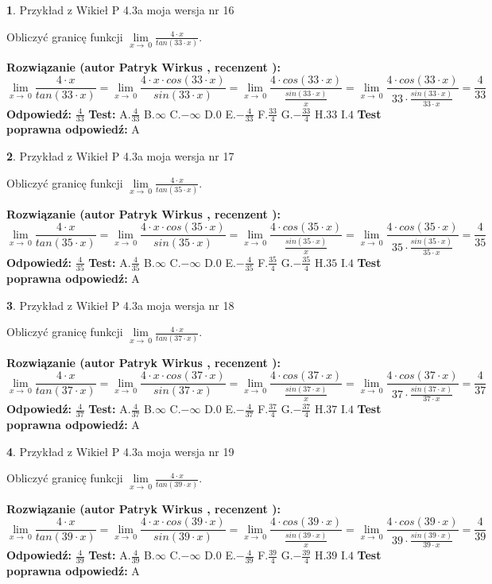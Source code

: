 \documentclass[12pt, a4paper]{article}
\theoremstyle{definition} %
\newtheorem{zad}{}
\newcommand{\zadStart}[1]{\begin{zad}#1\newline}
\newcommand{\zadStop}{\end{zad}}
\newcommand{\rozwStart}[2]{\noindent \textbf{Rozwiązanie (autor #1 , recenzent #2): }\newline}
\newcommand{\rozwStop}{\newline}
\newcommand{\odpStart}{\noindent \textbf{Odpowiedź:}\newline}
\newcommand{\odpStop}{\newline}
\newcommand{\testStart}{\noindent \textbf{Test:}\newline}
\newcommand{\testStop}{\newline}
\newcommand{\kluczStart}{\noindent \textbf{Test poprawna odpowiedź:}\newline}
\newcommand{\kluczStop}{\newline}
\begin{document}
\zadStart{Przykład z Wikieł P 4.3a moja wersja nr 16}


Obliczyć granicę funkcji $\lim\limits_{x\to\ 0}\frac{4 \cdot x}{tan(33 \cdot x)}$.
\zadStop
\rozwStart{Patryk Wirkus}{}
$$\lim\limits_{x\to\ 0}\frac{4 \cdot x}{tan(33 \cdot x)}=\lim\limits_{x\to\ 0}\frac{4 \cdot x \cdot cos(33 \cdot x)}{sin(33 \cdot x)}=\lim\limits_{x\to\ 0}\frac{4 \cdot cos(33 \cdot x)}{\frac{sin(33 \cdot x)}{x}}=\lim\limits_{x\to\ 0}\frac{4 \cdot cos(33 \cdot x)}{33 \cdot \frac{sin(33 \cdot x)}{33 \cdot x}} = \frac{4}{33}$$
\rozwStop
\odpStart
$\frac{4}{33}$
\odpStop
\testStart
A.$\frac{4}{33}$
B.$\infty$
C.$-\infty$
D.$0$
E.$-\frac{4}{33}$
F.$\frac{33}{4}$
G.$-\frac{33}{4}$
H.$33$
I.$4$
\testStop
\kluczStart
A
\kluczStop



\zadStart{Przykład z Wikieł P 4.3a moja wersja nr 17}


Obliczyć granicę funkcji $\lim\limits_{x\to\ 0}\frac{4 \cdot x}{tan(35 \cdot x)}$.
\zadStop
\rozwStart{Patryk Wirkus}{}
$$\lim\limits_{x\to\ 0}\frac{4 \cdot x}{tan(35 \cdot x)}=\lim\limits_{x\to\ 0}\frac{4 \cdot x \cdot cos(35 \cdot x)}{sin(35 \cdot x)}=\lim\limits_{x\to\ 0}\frac{4 \cdot cos(35 \cdot x)}{\frac{sin(35 \cdot x)}{x}}=\lim\limits_{x\to\ 0}\frac{4 \cdot cos(35 \cdot x)}{35 \cdot \frac{sin(35 \cdot x)}{35 \cdot x}} = \frac{4}{35}$$
\rozwStop
\odpStart
$\frac{4}{35}$
\odpStop
\testStart
A.$\frac{4}{35}$
B.$\infty$
C.$-\infty$
D.$0$
E.$-\frac{4}{35}$
F.$\frac{35}{4}$
G.$-\frac{35}{4}$
H.$35$
I.$4$
\testStop
\kluczStart
A
\kluczStop



\zadStart{Przykład z Wikieł P 4.3a moja wersja nr 18}


Obliczyć granicę funkcji $\lim\limits_{x\to\ 0}\frac{4 \cdot x}{tan(37 \cdot x)}$.
\zadStop
\rozwStart{Patryk Wirkus}{}
$$\lim\limits_{x\to\ 0}\frac{4 \cdot x}{tan(37 \cdot x)}=\lim\limits_{x\to\ 0}\frac{4 \cdot x \cdot cos(37 \cdot x)}{sin(37 \cdot x)}=\lim\limits_{x\to\ 0}\frac{4 \cdot cos(37 \cdot x)}{\frac{sin(37 \cdot x)}{x}}=\lim\limits_{x\to\ 0}\frac{4 \cdot cos(37 \cdot x)}{37 \cdot \frac{sin(37 \cdot x)}{37 \cdot x}} = \frac{4}{37}$$
\rozwStop
\odpStart
$\frac{4}{37}$
\odpStop
\testStart
A.$\frac{4}{37}$
B.$\infty$
C.$-\infty$
D.$0$
E.$-\frac{4}{37}$
F.$\frac{37}{4}$
G.$-\frac{37}{4}$
H.$37$
I.$4$
\testStop
\kluczStart
A
\kluczStop



\zadStart{Przykład z Wikieł P 4.3a moja wersja nr 19}


Obliczyć granicę funkcji $\lim\limits_{x\to\ 0}\frac{4 \cdot x}{tan(39 \cdot x)}$.
\zadStop
\rozwStart{Patryk Wirkus}{}
$$\lim\limits_{x\to\ 0}\frac{4 \cdot x}{tan(39 \cdot x)}=\lim\limits_{x\to\ 0}\frac{4 \cdot x \cdot cos(39 \cdot x)}{sin(39 \cdot x)}=\lim\limits_{x\to\ 0}\frac{4 \cdot cos(39 \cdot x)}{\frac{sin(39 \cdot x)}{x}}=\lim\limits_{x\to\ 0}\frac{4 \cdot cos(39 \cdot x)}{39 \cdot \frac{sin(39 \cdot x)}{39 \cdot x}} = \frac{4}{39}$$
\rozwStop
\odpStart
$\frac{4}{39}$
\odpStop
\testStart
A.$\frac{4}{39}$
B.$\infty$
C.$-\infty$
D.$0$
E.$-\frac{4}{39}$
F.$\frac{39}{4}$
G.$-\frac{39}{4}$
H.$39$
I.$4$
\testStop
\kluczStart
A
\kluczStop
\end{document}

